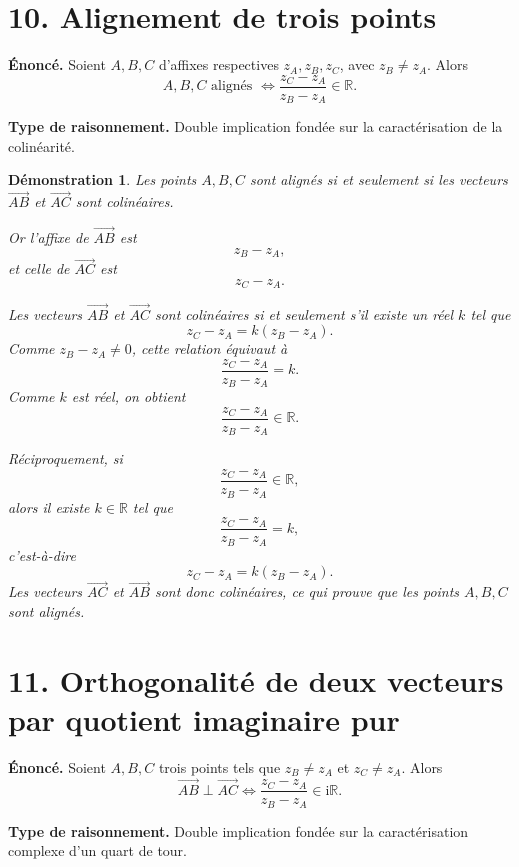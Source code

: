 \documentclass[11pt,a4paper]{article}
\newtheorem{prop}{Démonstration}
\newcommand{\R}{\mathbb{R}}
\newcommand{\ii}{\mathrm{i}}
\begin{document}
\section*{10. Alignement de trois points}

\textbf{Énoncé.} Soient $A,B,C$ d'affixes respectives $z_A,z_B,z_C$, avec $z_B\neq z_A$. Alors
\[
A,B,C \text{ alignés } \iff \frac{z_C-z_A}{z_B-z_A}\in\R.
\]

\textbf{Type de raisonnement.} Double implication fondée sur la caractérisation de la colinéarité.

\begin{prop}
Les points $A,B,C$ sont alignés si et seulement si les vecteurs $\overrightarrow{AB}$ et $\overrightarrow{AC}$ sont colinéaires.

Or l'affixe de $\overrightarrow{AB}$ est
\[
z_B-z_A,
\]
et celle de $\overrightarrow{AC}$ est
\[
z_C-z_A.
\]

Les vecteurs $\overrightarrow{AB}$ et $\overrightarrow{AC}$ sont colinéaires si et seulement s'il existe un réel $k$ tel que
\[
z_C-z_A=k(z_B-z_A).
\]
Comme $z_B-z_A\neq 0$, cette relation équivaut à
\[
\frac{z_C-z_A}{z_B-z_A}=k.
\]
Comme $k$ est réel, on obtient
\[
\frac{z_C-z_A}{z_B-z_A}\in\R.
\]

Réciproquement, si
\[
\frac{z_C-z_A}{z_B-z_A}\in\R,
\]
alors il existe $k\in\R$ tel que
\[
\frac{z_C-z_A}{z_B-z_A}=k,
\]
c'est-à-dire
\[
z_C-z_A=k(z_B-z_A).
\]
Les vecteurs $\overrightarrow{AC}$ et $\overrightarrow{AB}$ sont donc colinéaires, ce qui prouve que les points $A,B,C$ sont alignés.
\end{prop}

\section*{11. Orthogonalité de deux vecteurs par quotient imaginaire pur}

\textbf{Énoncé.} Soient $A,B,C$ trois points tels que $z_B\neq z_A$ et $z_C\neq z_A$. Alors
\[
\overrightarrow{AB}\perp \overrightarrow{AC}
\iff
\frac{z_C-z_A}{z_B-z_A}\in \ii\R.
\]

\textbf{Type de raisonnement.} Double implication fondée sur la caractérisation complexe d'un quart de tour.
\end{document}
